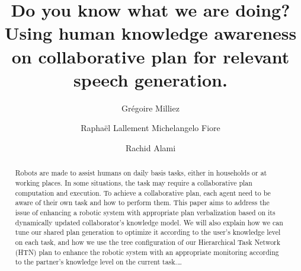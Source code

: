 \documentclass{llncs}
\begin{document}
\title{\LARGE \bf
Do you know what we are doing? Using human knowledge awareness on collaborative plan for relevant speech generation.
}
%
%
\author{Gr\'egoire Milliez \and Rapha\"el Lallement
Michelangelo Fiore \and Rachid Alami}
%
%
%


\maketitle              %

\begin{abstract}
Robots are made to assist humans on daily basis tasks, either in households or at working places. In some situations, the task may require a collaborative plan computation and execution.
To achieve a collaborative plan, each agent need to be aware of their own task and how to perform them. This paper aims to address the issue of enhancing a robotic system with appropriate plan verbalization based on its dynamically updated collaborator's knowledge model.
 We will also explain how we can tune our shared plan generation to optimize it according to the user's knowledge level on each task, and how we use the tree configuration of our Hierarchical Task Network (HTN) plan to enhance the robotic system with an appropriate monitoring according to the partner's knowledge level on the current task.\dots
{}
\end{abstract}
%


\end{document}
